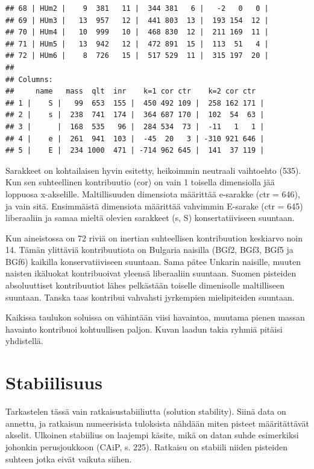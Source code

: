 \documentclass[
  finnish,
]{book}
\begin{document}
\begin{verbatim}
## 68 | HUm2 |    9  381   11 |  344 381   6 |   -2   0   0 |
## 69 | HUm3 |   13  957   12 |  441 803  13 |  193 154  12 |
## 70 | HUm4 |   10  999   10 |  468 830  12 |  211 169  11 |
## 71 | HUm5 |   13  942   12 |  472 891  15 |  113  51   4 |
## 72 | HUm6 |    8  726   15 |  517 529  11 |  315 197  20 |
## 
## Columns:
##     name   mass  qlt  inr    k=1 cor ctr    k=2 cor ctr  
## 1 |    S |   99  653  155 |  450 492 109 |  258 162 171 |
## 2 |    s |  238  741  174 |  364 687 170 |  102  54  63 |
## 3 |      |  168  535   96 |  284 534  73 |  -11   1   1 |
## 4 |    e |  261  941  103 |  -45  20   3 | -310 921 646 |
## 5 |    E |  234 1000  471 | -714 962 645 |  141  37 119 |
\end{verbatim}

Sarakkeet on kohtailaisen hyvin esitetty, heikoimmin neutraali vaihtoehto (535).
Kun sen suhteellinen kontribuutio (cor) on vain 1 toisella dimensiolla jää
loppuosa x-akselille. Maltillisuuden dimensiota määrittää e-sarakke (ctr = 646),
ja vain sitä. Ensimmäistä dimensiota määrittää vahvimmin E-sarake (ctr = 645)
liberaaliin ja samaa mieltä olevien sarakkeet (s, S) konsertatiiviseen suuntaan.

Kun aineistossa on 72 riviä on inertian suhteellisen kontribuution keskiarvo
noin 14. Tämän ylittäviä kontribuutiota on Bulgaria naisilla (BGf2, BGf3, BGf5
ja BGf6) kaikilla konservatiiviseen suuntaan. Sama pätee Unkarin naisille, muuten
naisten ikäluokat kontribuoivat yleensä liberaaliin suuntaan. Suomen pisteiden
absoluuttiset kontribuutiot lähes pelkästään toiselle dimenisolle maltilliseen
suuntaan. Tanska taas kontribui vahvahsti jyrkempien mielipiteiden suuntaan.

Kaikissa taulukon soluissa on vähintään viisi havaintoa, muutama pienen massan
havainto kontribuoi kohtuullisen paljon. Kuvan laadun takia ryhmiä pitäisi
yhdistellä.

\hypertarget{stabiilisuus}{%
\section{Stabiilisuus}\label{stabiilisuus}}

Tarkastelen tässä vain ratkaisustabiiliutta (solution stability). Siinä data on
annettu, ja ratkaisun numeerisista tuloksista nähdään miten pisteet määritättävät
akselit. Ulkoinen stabiilius on laajempi käsite, mikä on datan suhde esimerkiksi
johonkin perusjoukkoon (CAiP, s. 225). Ratkaisu on stabiili niiden pisteiden
suhteen jotka eivät vaikuta siihen.
\end{document}
